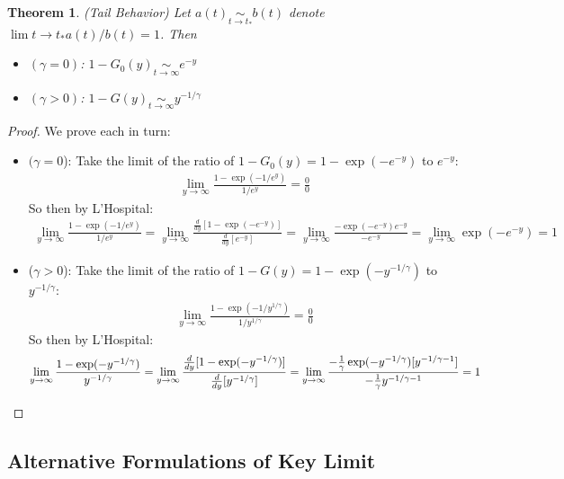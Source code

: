 \documentclass[12pt]{article}
\theoremstyle{plain}
\newtheorem{thm}{Theorem}[section]
\theoremstyle{definition}
\theoremstyle{remark}
\newcommand{\ra}{\rightarrow}
\begin{document}
\begin{thm}\emph{(Tail Behavior)}
Let $a(t)\underset{t\ra t_*}{\sim} b(t)$ denote $\lim{t\ra t_*} a(t)/b(t)=1$.
Then
\begin{itemize}
  \item $(\gamma=0)$: $1-G_0(y)\underset{t\ra\infty}{\sim} e^{-y}$
  \item $(\gamma>0)$: $1-G(y)\underset{t\ra\infty}{\sim} y^{-1/\gamma}$
\end{itemize}
\end{thm}
\begin{proof}
We prove each in turn:
\begin{itemize}
  \item $(\gamma=0$):
    Take the limit of the ratio of $1-G_0(y)=1-\exp(-e^{-y})$ to $e^{-y}$:
    \begin{align*}
      \lim_{y\ra\infty}
      \frac{1-\exp(-1/e^y)}{1/e^{y}}
      =
      \frac{0}{0}
    \end{align*}
    So then by L'Hospital:
    \begin{align*}
      \lim_{y\ra\infty}
      \frac{1-\exp(-1/e^y)}{1/e^{y}}
      =
      \lim_{y\ra\infty}
      \frac{\frac{d}{dy}[1-\exp(-e^{-y})]}{\frac{d}{dy}[e^{-y}]}
      =
      \lim_{y\ra\infty}
      \frac{-\exp(-e^{-y})e^{-y}}{-e^{-y}}
      =
      \lim_{y\ra\infty}
      \exp(-e^{-y})
      = 1
    \end{align*}

  \item
    ($\gamma>0$):
    Take the limit of the ratio of
    $1-G(y)=1-\exp(-y^{-1/\gamma})$
    to $y^{-1/\gamma}$:
    \begin{align*}
      \lim_{y\ra\infty}
      \frac{1-\exp(-1/y^{1/\gamma})}{1/y^{1/\gamma}}
      =
      \frac{0}{0}
    \end{align*}
    So then by L'Hospital:
    \begin{align*}
      \lim_{y\ra\infty}
      \frac{1-\exp(-y^{-1/\gamma})}{y^{-1/\gamma}}
      =
      \lim_{y\ra\infty}
      \frac{%
        \frac{d}{dy}[1-\exp(-y^{-1/\gamma})]
      }{%
        \frac{d}{dy}[y^{-1/\gamma}]
      }
      =
      \lim_{y\ra\infty}
      \frac{%
        -\frac{1}{\gamma}
        \exp(-y^{-1/\gamma})[y^{-1/\gamma-1}]
      }{%
        -
        \frac{1}{\gamma}
        y^{-1/\gamma-1}
      }
      = 1
    \end{align*}
\end{itemize}
\end{proof}


\clearpage
\subsection{Alternative Formulations of Key Limit}
\end{document}
